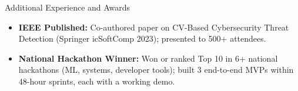 \documentclass[]{mcdowellcv}
\begin{document}
\begin{cvsection}{Additional Experience and Awards}
  \begin{cvsubsection}{}{}{}
    \begin{itemize}
      \item \textbf{IEEE Published:} Co-authored paper on CV-Based Cybersecurity Threat Detection (Springer icSoftComp 2023); presented to 500+ attendees.
      \item \textbf{National Hackathon Winner:} Won or ranked Top 10 in 6+ national hackathons (ML, systems, developer tools); built 3 end-to-end MVPs within 48-hour sprints, each with a working demo.
    \end{itemize}
  \end{cvsubsection}
\end{cvsection}
\end{document}
